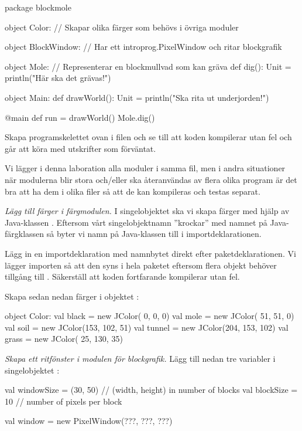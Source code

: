 \begin{Code}
package blockmole

object Color:
  // Skapar olika färger som behövs i övriga moduler


object BlockWindow:
  // Har ett introprog.PixelWindow och ritar blockgrafik

object Mole: // Representerar en blockmullvad som kan gräva
  def dig(): Unit = println("Här ska det grävas!")

object Main:
  def drawWorld(): Unit = println("Ska rita ut underjorden!")

  @main def run = 
    drawWorld()
    Mole.dig()
\end{Code}

\noindent Skapa programskelettet ovan i filen  och se till att koden kompilerar utan fel och går att köra med utskrifter som förväntat.

Vi lägger i denna laboration alla moduler i samma fil, men i andra situationer när  modulerna blir stora och/eller ska återanvändas av flera olika program är det bra att ha dem i olika filer så att de kan kompileras och testas separat.


\Task \emph{Lägg till färger i färgmodulen.} I singelobjektet  ska vi skapa färger med hjälp av Java-klassen . Eftersom vårt singelobjektnamn ''krockar'' med namnet på Java-färgklassen så byter vi namn på Java-klassen till  i importdeklarationen.

\Subtask
Lägg in en importdeklaration med namnbytet direkt efter paketdeklarationen. Vi lägger importen så att den syns i hela paketet eftersom flera objekt behöver tillgång till . Säkerställ att koden fortfarande kompilerar utan fel.

\Subtask
Skapa sedan nedan färger i objektet :
\begin{Code}
object Color:
  val black  = new JColor(  0,   0,   0)
  val mole   = new JColor( 51,  51,   0)
  val soil   = new JColor(153, 102,  51)
  val tunnel = new JColor(204, 153, 102)
  val grass  = new JColor( 25, 130,  35)
\end{Code}


\Task \emph{Skapa ett ritfönster i modulen för blockgrafik.} Lägg till nedan tre variabler i singelobjektet :

\begin{Code}
  val windowSize = (30, 50)  // (width, height) in number of blocks
  val blockSize  = 10        // number of pixels per block

  val window = new PixelWindow(???, ???, ???)
\end{Code}

